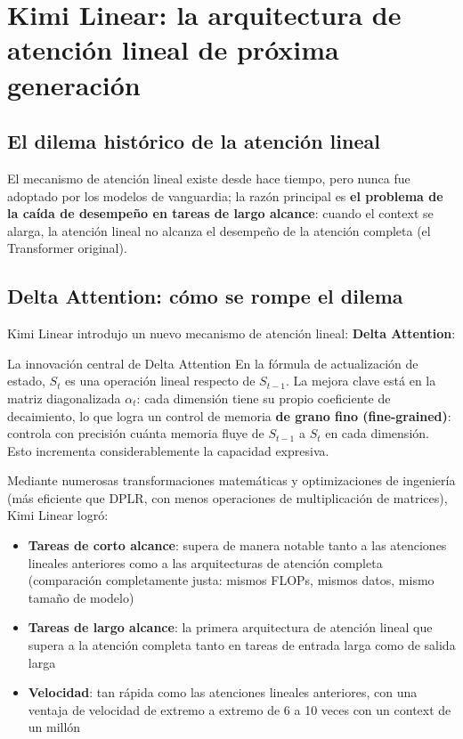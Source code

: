 \section{Kimi Linear: la arquitectura de atención lineal de próxima generación}

\subsection{El dilema histórico de la atención lineal}

El mecanismo de atención lineal existe desde hace tiempo, pero nunca fue adoptado por los modelos de vanguardia; la razón principal es \textbf{el problema de la caída de desempeño en tareas de largo alcance}: cuando el context se alarga, la atención lineal no alcanza el desempeño de la atención completa (el Transformer original).

\subsection{Delta Attention: cómo se rompe el dilema}

Kimi Linear introdujo un nuevo mecanismo de atención lineal: \textbf{Delta Attention}:

\begin{importantbox}{La innovación central de Delta Attention}
En la fórmula de actualización de estado, $S_t$ es una operación lineal respecto de $S_{t-1}$. La mejora clave está en la matriz diagonalizada $\alpha_t$: cada dimensión tiene su propio coeficiente de decaimiento, lo que logra un control de memoria \textbf{de grano fino (fine-grained)}: controla con precisión cuánta memoria fluye de $S_{t-1}$ a $S_t$ en cada dimensión. Esto incrementa considerablemente la capacidad expresiva.
\end{importantbox}

Mediante numerosas transformaciones matemáticas y optimizaciones de ingeniería (más eficiente que DPLR, con menos operaciones de multiplicación de matrices), Kimi Linear logró:

\begin{itemize}
\item \textbf{Tareas de corto alcance}: supera de manera notable tanto a las atenciones lineales anteriores como a las arquitecturas de atención completa (comparación completamente justa: mismos FLOPs, mismos datos, mismo tamaño de modelo)
\item \textbf{Tareas de largo alcance}: la primera arquitectura de atención lineal que supera a la atención completa tanto en tareas de entrada larga como de salida larga
\item \textbf{Velocidad}: tan rápida como las atenciones lineales anteriores, con una ventaja de velocidad de extremo a extremo de 6 a 10 veces con un context de un millón
\end{itemize}

